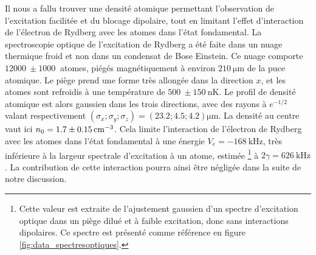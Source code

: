 Il nous a fallu trouver une densité atomique permettant l'observation de l'excitation facilitée et du blocage dipolaire, tout en limitant l'effet d'interaction de l'électron de Rydberg avec les atomes dans l'état fondamental.
La spectroscopie optique de l'excitation de Rydberg a été faite dans un nuage thermique froid et non dans un condensat de Bose Einstein.
Ce nuage comporte $\SI{12000}{} \pm \SI{1000}{}$ atomes, piégés magnétiquement à environ $\SI{210}{\um}$ de la puce atomique.
Le piège prend une forme très allongée dans la direction $x$, et les atomes sont refroidis à une température de $\SI{500}{} \pm \SI{150}{\nano\kelvin}$.
Le profil de densité atomique est alors gaussien dans les trois directions, avec des rayons à $e^{-1/2}$ valant respectivement $(\sigma_x;\sigma_y;\sigma_z) = (\num{23.2} ; \num{4.5} ; \num{4.2})\si{\um}$.
La densité au centre vaut ici $n_0 = \num{1.7}\pm\SI{0.15}{\per\raiseto{3}\cm}$.
Cela limite l'interaction de l'électron de Rydberg avec les atomes dans l'état fondamental à une énergie $V_e = -\SI{168}{\kHz}$, très inférieure à la largeur spectrale d'excitation à un atome, estimée \footnote{
Cette valeur est extraite de l'ajustement gaussien d'un spectre d'excitation optique dans un piège dilué et à faible excitation, donc sans interactions dipolaires.
Ce spectre est présenté comme référence en figure \eqref{fig:data_spectresoptiques}.}
à $2\gamma = \SI{626}{\kHz}$.
La contribution de cette interaction pourra ainsi être négligée dans la suite de notre discussion.


